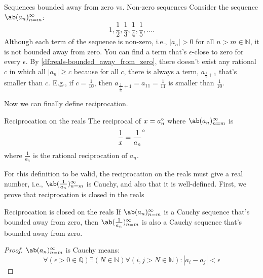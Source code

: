 \begin{exmp}{Sequences bounded away from zero vs. Non-zero sequences}{}
  Consider the sequence $\sequence{a_n}{n = m}{\infty}$:
  \begin{equation}
    1, \frac{1}{2}, \frac{1}{3}, \frac{1}{4}, \frac{1}{5}, \dots.
  \end{equation}
  Although each term of the sequence is non-zero, i.e., $| a_n | > 0$ for all
  $n > m \in \mathbb{N}$, it is not bounded away from zero. You can find a term that's
  $\epsilon$-close to zero for every $\epsilon$. By \cref{df:reals-bounded_away_from_zero},
  there doesn't exist any rational $c$ in which all $| a_n | \geq c$ because for all $c$,
  there is always a term, $a_{\frac{1}{c}+1}$ that's smaller than $c$. E.g., if $c = \frac{1}{10}$,
  then $a_{\frac{1}{\frac{1}{10}}+1} = a_{11} = \frac{1}{11}$ is smaller than $\frac{1}{10}$.
\end{exmp}

Now we can finally define reciprocation.

\begin{df}{Reciprocation on the reals}{}
  The reciprocal of \(x = a_n^{\diamond}\) where \(\sequence{a_n}{n = m}{\infty}\) is
  \begin{equation}
    \frac{1}{x} = \frac{1}{a_n}^{\diamond}
  \end{equation}
  where \(\frac{1}{a_n}\) is the rational reciprocation of \(a_n\).
\end{df}

For this definition to be valid, the reciprocation on the reals must give a real
number, i.e., \(\sequence{\frac{1}{a_n}}{n = m}{\infty}\) is Cauchy, and also that it
is well-defined. First, we prove that reciprocation is closed in the reals

\begin{prop}{Reciprocation is closed on the reals}{}
  If \(\sequence{a_n}{n = m}{\infty}\) is a Cauchy sequence that's bounded away from
  zero, then \(\sequence{\frac{1}{a_n}}{n = m}{\infty}\) is also a Cauchy sequence
  that's bounded away from zero.
\end{prop}
\begin{proof}
  \(\sequence{a_n}{n = m}{\infty}\) is Cauchy means:
  \begin{equation}
    \forall (\epsilon > 0 \in \mathbb{Q}) \exists (N \in \mathbb{N}) \forall (i, j > N \in \mathbb{N}) : |a_i - a_j| < \epsilon
  \end{equation}
\end{proof}


